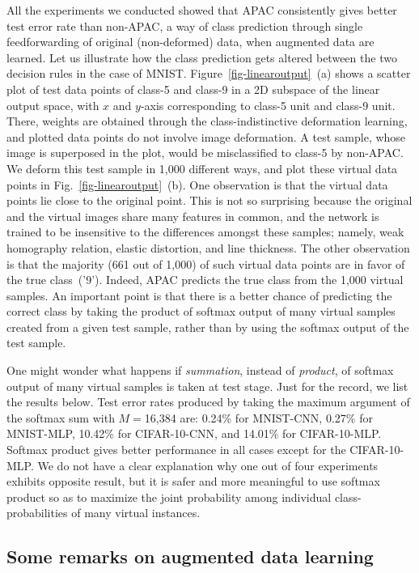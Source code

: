 \documentclass[10pt,twocolumn,letterpaper]{article}
\begin{document}
All the experiments we conducted showed that APAC consistently gives better test error rate than non-APAC, 
a way of class prediction through single feedforwarding of original (non-deformed) data, 
when augmented data are learned.
Let us illustrate how the class prediction gets altered between the two decision rules in the case of MNIST.
Figure~\ref{fig-linearoutput}~(a) 
shows a scatter plot of test data points of class-5 and class-9 in a 2D subspace of the linear output space,
with $x$ and $y$-axis corresponding to class-5 unit and class-9 unit.
There, weights are obtained through the class-indistinctive deformation learning, and
plotted data points do not involve image deformation.
A test sample, whose image is superposed in the plot, would be misclassified to class-5 by non-APAC.
We deform this test sample in 1,000 different ways, and plot these virtual data points
in Fig.~\ref{fig-linearoutput}~(b).
One observation is that the virtual data points lie close to the original point.
This is not so surprising because the original and the virtual images share many features in common, and
the network is trained to be insensitive to the differences amongst these samples; namely,
weak homography relation, elastic distortion, and line thickness.
The other observation is that the majority (661 out of 1,000) 
of such virtual data points are in favor of the true class~('9').
Indeed, APAC predicts the true class from the 1,000 virtual samples.
An important point is that there is a better chance of predicting the correct class 
by taking the product of softmax output of many virtual samples created from a given test sample,
rather than by using the softmax output of the test sample.

One might wonder what happens if {\it summation}, instead of {\it product}, of softmax output of many virtual samples
is taken at test stage.
Just for the record, we list the results below. 
Test error rates produced by taking the maximum argument of the softmax sum with $M=$16,384 are: 
0.24\% for MNIST-CNN, 0.27\% for MNIST-MLP, 10.42\% for CIFAR-10-CNN, and 14.01\% for CIFAR-10-MLP.
Softmax product gives better performance in all cases except for the CIFAR-10-MLP.
We do not have a clear explanation why one out of four experiments exhibits opposite result,
but it is safer and more meaningful 
to use softmax product so as to maximize the joint probability
among individual class-probabilities of many virtual instances.

\subsection{Some remarks on augmented data learning}
\end{document}

